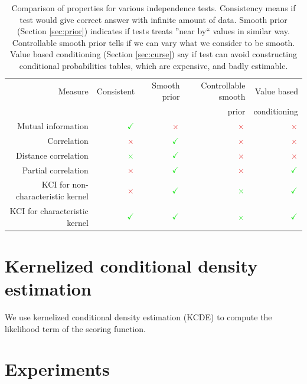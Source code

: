 \documentclass{article} %
\begin{document}
\begin{table}[t]
\centering
\tiny
\begin{tabular}{rrrrr}
\hline
Measure & Consistent & Smooth prior & Controllable smooth & Value based\\
& & & prior & conditioning\\
\hline
Mutual information & $\color{LimeGreen} \checkmark $ & $\color{Maroon}\times$ & $\color{Maroon}\times$ &   $\color{Maroon}\times$ \\
Correlation & $\color{Maroon}\times$  & $\color{LimeGreen} \checkmark $ & $\color{Maroon}\times$ & $\color{Maroon}\times$ \\
Distance correlation & $\color{LimeGreen}\times$  & $\color{LimeGreen} \checkmark $ & $\color{Maroon}\times$ & $\color{Maroon}\times$ \\
Partial correlation & $\color{Maroon}\times$  & $\color{LimeGreen} \checkmark $ & $\color{Maroon}\times$ & $\color{LimeGreen}\checkmark$ \\
KCI for non-characteristic kernel & $\color{Maroon}\times$  & $\color{LimeGreen} \checkmark $ & $\color{LimeGreen}\times$ & $\color{LimeGreen}\checkmark$ \\
KCI for characteristic kernel & $\color{LimeGreen}\checkmark$  & $\color{LimeGreen} \checkmark $ & $\color{LimeGreen}\times$ & $\color{LimeGreen}\checkmark$ \\
\hline
\end{tabular}
\caption{Comparison of properties for various independence tests. Consistency means if test 
  would give correct answer with infinite amount of data. Smooth prior (Section \ref{sec:prior}) indicates if tests
  treats ''near by`` values in similar way. Controllable smooth prior tells if we
  can vary what we consider to be smooth. Value based conditioning (Section \ref{sec:curse}) 
  say if test can avoid constructing conditional probabilities tables, which are expensive, and
  badly estimable.}
  
\label{tab:compar}
\end{table}

\section{Kernelized conditional density estimation}
We use kernelized conditional density estimation (KCDE) to compute the likelihood term of the scoring function.  

\section{Experiments}
\end{document}
